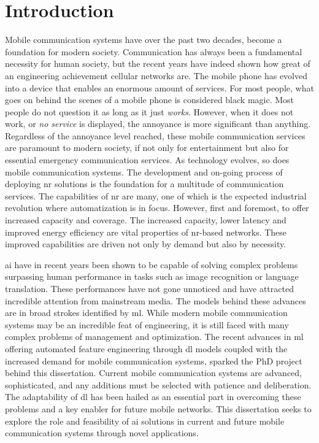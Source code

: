 \chapter*{Introduction}\label{ch:introduction}
Mobile communication systems have over the past two decades, become a foundation for modern society. Communication has always been a fundamental necessity for human society, but the recent years have indeed shown how great of an engineering achievement cellular networks are. The mobile phone has evolved into a device that enables an enormous amount of services. For most people, what goes on behind the scenes of a mobile phone is considered black magic. Most people do not question it as long as it just \emph{works}. However, when it does not work, or \emph{no service} is displayed, the annoyance is more significant than anything. Regardless of the annoyance level reached, these mobile communication services are paramount to modern society, if not only for entertainment but also for essential emergency communication services. As technology evolves, so does mobile communication systems. The development and on-going process of deploying \gls{nr} solutions is the foundation for a multitude of communication services. The capabilities of \gls{nr} are many, one of which is the expected industrial revolution where automatization is in focus. However, first and foremost, to offer increased capacity and coverage. The increased capacity, lower latency and improved energy efficiency are vital properties of \gls{nr}-based networks. These improved capabilities are driven not only by demand but also by necessity. 

\gls{ai} have in recent years been shown to be capable of solving complex problems surpassing human performance in tasks such as image recognition or language translation. These performances have not gone unnoticed and have attracted incredible attention from mainstream media. The models behind these advances are in broad strokes identified by \acrfull{ml}. While modern mobile communication systems may be an incredible feat of engineering, it is still faced with many complex problems of management and optimization. The recent advances in \gls{ml} offering automated feature engineering through \acrlong{dl} models coupled with the increased demand for mobile communication systems, sparked the PhD project behind this dissertation. Current mobile communication systems are advanced, sophisticated, and any additions must be selected with patience and deliberation. The adaptability of \acrlong{dl} has been hailed as an essential part in overcoming these problems and a key enabler for future mobile networks. This dissertation seeks to explore the role and feasibility of \gls{ai} solutions in current and future mobile communication systems through novel applications. 

